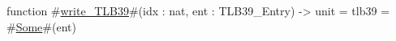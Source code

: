 function #\hyperref[sailRISCVzwritezyTLB39]{write\_TLB39}#(idx : nat, ent : TLB39_Entry) -> unit =
  tlb39 = #\hyperref[sailRISCVzSome]{Some}#(ent)
